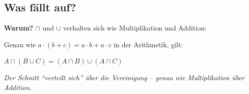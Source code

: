 \documentclass[12pt, a4paper]{article}
\begin{document}
\subsection*{Was fällt auf?}

\begin{center}
\end{center}

\textbf{Warum?} $\cap$ und $\cup$ verhalten sich wie Multiplikation und Addition:

Genau wie $a \cdot (b + c) = a \cdot b + a \cdot c$ in der Arithmetik, gilt:

$A \cap (B \cup C) = (A \cap B) \cup (A \cap C)$

\textit{Der Schnitt "`verteilt sich"' über die Vereinigung -- genau wie Multiplikation über Addition.}
\end{document}
